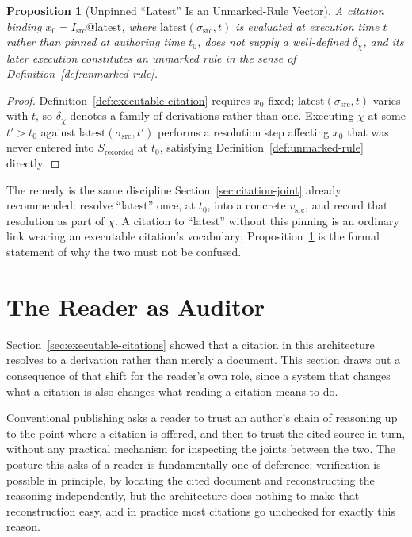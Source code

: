\documentclass[11pt]{article}
\newtheorem{proposition}[theorem]{Proposition}
\theoremstyle{definition}
\begin{document}
\begin{proposition}[Unpinned ``Latest'' Is an Unmarked-Rule Vector]
\label{prop:latest-unmarked}
A citation binding $x_0 = I_{\mathrm{src}}@\mathrm{latest}$, where $\mathrm{latest}(\sigma_{\mathrm{src}}, t)$ is evaluated at execution time $t$ rather than pinned at authoring time $t_0$, does not supply a well-defined $\delta_\chi$, and its later execution constitutes an unmarked rule in the sense of Definition~\ref{def:unmarked-rule}.
\end{proposition}
\begin{proof}
Definition~\ref{def:executable-citation} requires $x_0$ fixed; $\mathrm{latest}(\sigma_{\mathrm{src}},t)$ varies with $t$, so $\delta_\chi$ denotes a family of derivations rather than one. Executing $\chi$ at some $t' > t_0$ against $\mathrm{latest}(\sigma_{\mathrm{src}},t')$ performs a resolution step affecting $x_0$ that was never entered into $S_{\mathrm{recorded}}$ at $t_0$, satisfying Definition~\ref{def:unmarked-rule} directly.
\end{proof}

The remedy is the same discipline Section~\ref{sec:citation-joint} already recommended: resolve ``latest'' once, at $t_0$, into a concrete $v_{\mathrm{src}}$, and record that resolution as part of $\chi$. A citation to ``latest'' without this pinning is an ordinary link wearing an executable citation's vocabulary; Proposition~\ref{prop:latest-unmarked} is the formal statement of why the two must not be confused.

\section{The Reader as Auditor}
\label{sec:reader-auditor}

Section~\ref{sec:executable-citations} showed that a citation in this architecture resolves to a derivation rather than merely a document. This section draws out a consequence of that shift for the reader's own role, since a system that changes what a citation is also changes what reading a citation means to do.

Conventional publishing asks a reader to trust an author's chain of reasoning up to the point where a citation is offered, and then to trust the cited source in turn, without any practical mechanism for inspecting the joints between the two. The posture this asks of a reader is fundamentally one of deference: verification is possible in principle, by locating the cited document and reconstructing the reasoning independently, but the architecture does nothing to make that reconstruction easy, and in practice most citations go unchecked for exactly this reason.
\end{document}
